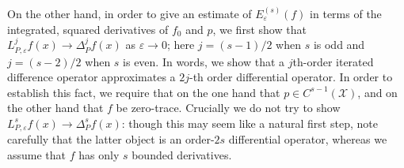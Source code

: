 \documentclass{article}
\newcommand{\1}{\mathbf{1}}
\newcommand{\mc}[1]{\mathcal{#1}}
\theoremstyle{alden}
\theoremstyle{aldenthm}
\theoremstyle{definition}
\theoremstyle{remark}
\begin{document}
On the other hand, in order to give an estimate of $E_{\varepsilon}^{(s)}(f)$ in terms of the integrated, squared derivatives of $f_0$ and $p$, we first show that $L_{P,\varepsilon}^jf(x) \to \Delta_P^jf(x)$ as $\varepsilon \to 0$; here $j = (s - 1)/2$ when $s$ is odd and $j = (s - 2)/2$ when $s$ is even. In words, we show that a $j$th-order iterated difference operator approximates a $2j$-th order differential operator.  In order to establish this fact, we require that on the one hand that $p \in C^{s - 1}(\mc{X})$, and on the other hand that $f$ be zero-trace. Crucially we do not try to show $L_{P,\varepsilon}^sf(x) \to \Delta_{P}^sf(x)$: though this may seem like a natural first step, note carefully that the latter object is an order-$2s$ differential operator, whereas we assume that $f$ has only $s$ bounded derivatives. 


\end{document}
